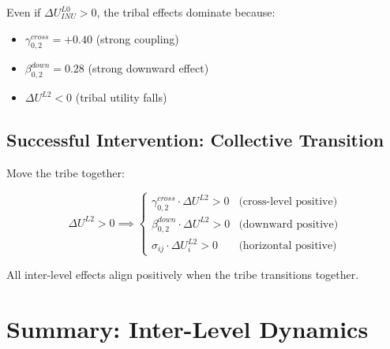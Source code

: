 Even if $\Delta U^{L0}_{INU} > 0$, the tribal effects dominate because:
\begin{itemize}
\item $\gamma^{cross}_{0,2} = +0.40$ (strong coupling)
\item $\beta^{down}_{0,2} = 0.28$ (strong downward effect)
\item $\Delta U^{L2} < 0$ (tribal utility falls)
\end{itemize}

\subsection{Successful Intervention: Collective Transition}

Move the tribe together:

\begin{equation}
\Delta U^{L2} > 0 \implies \begin{cases}
\gamma^{cross}_{0,2} \cdot \Delta U^{L2} > 0 & \text{(cross-level positive)} \\
\beta^{down}_{0,2} \cdot \Delta U^{L2} > 0 & \text{(downward positive)} \\
\sigma_{ij} \cdot \Delta U^{L2}_i > 0 & \text{(horizontal positive)}
\end{cases}
\end{equation}

All inter-level effects align positively when the tribe transitions together.

\section{Summary: Inter-Level Dynamics}
\label{sec:aaa-inter-level-summary}

